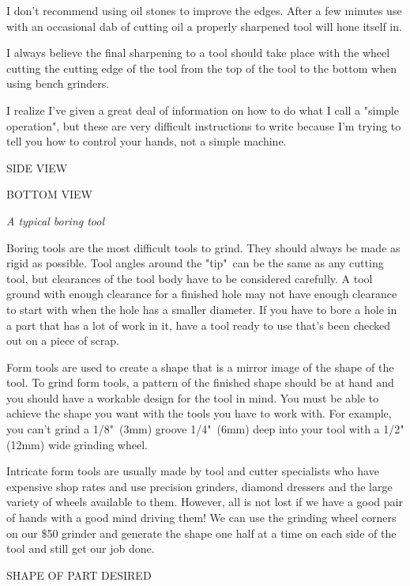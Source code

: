 I don't recommend using oil stones to improve the edges. After a few minutes use
with an occasional dab of cutting oil a properly sharpened tool will hone itself
in.

I always believe the final sharpening to a tool should take place with the wheel
cutting the cutting edge of the tool from the top of the tool to the bottom when
using bench grinders.

I realize I've given a great deal of information on how to do what I call a
"simple operation", but these are very difficult instructions to write because
I'm trying to tell you how to control your hands, not a simple machine.

\bigskip
SIDE VIEW

BOTTOM VIEW
\bigskip

\textit{A typical boring tool}
\bigskip


Boring tools are the most difficult tools to grind. They should always be made
as rigid as possible. Tool angles around the "tip"\ can be the same as any
cutting tool, but clearances of the tool body have to be considered carefully. A
tool ground with enough clearance for a finished hole may not have enough
clearance to start with when the hole has a smaller diameter. If you have to
bore a hole in a part that has a lot of work in it, have a tool ready to use
that's been checked out on a piece of scrap.


Form tools are used to create a shape that is a mirror image of the shape of the
tool. To grind form tools, a pattern of the finished shape should be at hand and
you should have a workable design for the tool in mind. You must be able to
achieve the shape you want with the tools you have to work with. For example,
you can't grind a 1/8"\ (3mm) groove 1/4"\ (6mm) deep into your tool with a 1/2"
(12mm) wide grinding wheel.

Intricate form tools are usually made by tool and cutter specialists who have
expensive shop rates and use precision grinders, diamond dressers and the large
variety of wheels available to them. However, all is not lost if we have a good
pair of hands with a good mind driving them! We can use the grinding wheel
corners on our \$50 grinder and generate the shape one half at a time on each
side of the tool and still get our job done.

\bigskip
SHAPE OF PART DESIRED

